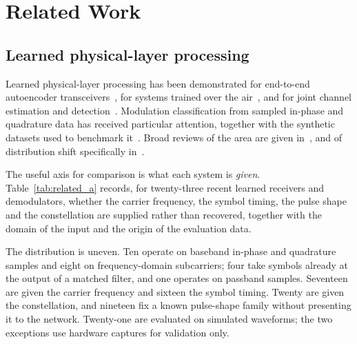 \documentclass[journal]{IEEEtran}   %
\begin{document}
\section{Related Work}
\label{sec:related}

\subsection{Learned physical-layer processing}
Learned physical-layer processing has been demonstrated for end-to-end
autoencoder transceivers~\cite{oshea2017intro}, for systems trained over the
air~\cite{dorner2018ota}, and for joint channel estimation and
detection~\cite{ye2018power}. Modulation classification from sampled in-phase
and quadrature data has received particular attention, together with the
synthetic datasets used to benchmark it~\cite{satyanarayan2023RML}. Broad
reviews of the area are given in~\cite{hoydis2021nativeAirInterface,
akroutMLPtoGPT, wangDlphysicalLayer}, and of distribution shift specifically
in~\cite{akrout2023domaingeneralization}.

The useful axis for comparison is what each system is \emph{given}.
Table~\ref{tab:related_a} records, for twenty-three recent learned receivers and
demodulators, whether the carrier frequency, the symbol timing, the pulse shape
and the constellation are supplied rather than recovered, together with the
domain of the input and the origin of the evaluation data.

The distribution is uneven. Ten operate on baseband in-phase and quadrature
samples and eight on frequency-domain subcarriers; four take symbols already at
the output of a matched filter, and one operates on passband samples.
Seventeen are given the carrier frequency and sixteen the symbol timing. Twenty
are given the constellation, and nineteen fix a known pulse-shape family without
presenting it to the network. Twenty-one are evaluated on simulated waveforms;
the two exceptions use hardware captures for validation only.
\end{document}
